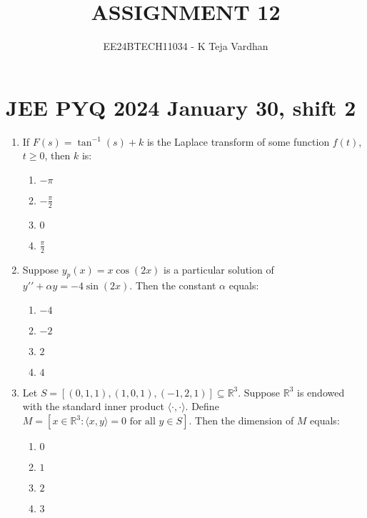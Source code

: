 \documentclass[journal]{IEEEtran}
\newcommand{\brak}[1]{\left( #1 \right)}
\newcommand{\sbrak}[1]{\left[ #1 \right]}
\begin{document}

\title{ASSIGNMENT 12}
\author{EE24BTECH11034 - K Teja Vardhan}
{\let\newpage\relax\maketitle}

\section{JEE PYQ 2024 January 30, shift 2}
\begin{enumerate}

  \item If $F\brak{s} = \tan^{-1}\brak{s} + k$ is the Laplace transform of some function $f\brak{t}$, $t \geq 0$, then $k$ is:
    
    \begin{multicols}{4}
    \begin{enumerate}
        \item $-\pi$
        \item $-\frac{\pi}{2}$
        \item $0$
        \item $\frac{\pi}{2}$
    \end{enumerate}
    \end{multicols}

  \item Suppose $y_p\brak{x} = x \cos\brak{2x}$ is a particular solution of $y\prime\prime + \alpha y = -4 \sin\brak{2x}$. Then the constant $\alpha$ equals:
    
    \begin{multicols}{4}
    \begin{enumerate}
        \item $-4$
        \item $-2$
        \item $2$
        \item $4$
    \end{enumerate}
    \end{multicols}

  \item Let $S = \sbrak{\brak{0,1,1}, \brak{1,0,1}, \brak{-1,2,1}} \subseteq \mathbb{R}^3$. Suppose $\mathbb{R}^3$ is endowed with the standard inner product $\langle \cdot, \cdot \rangle$. Define $M = \sbrak{x \in \mathbb{R}^3 : \langle x, y \rangle = 0 \text{ for all } y \in S}$. Then the dimension of $M$ equals:

    \begin{multicols}{4}
    \begin{enumerate}
        \item $0$
        \item $1$
        \item $2$
        \item $3$
    \end{enumerate}
    \end{multicols}


\end{enumerate}
\end{document}
